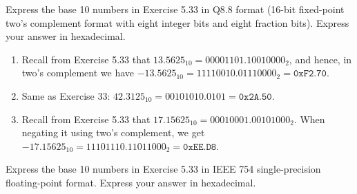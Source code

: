 \documentclass[12pt]{article}
\newenvironment{ex}[2][Exercise]{\begin{trivlist}
		\item[\hskip \labelsep {\bfseries #1}\hskip \labelsep {\bfseries #2.}]}{\end{trivlist}}
\newenvironment{sol}[1][Solution]{\begin{trivlist}
		\item[\hskip \labelsep {\bfseries #1:}]}{\end{trivlist}}
\begin{document}
\begin{ex}{5.35}
	Express the base 10 numbers in Exercise 5.33 in Q8.8 format (16-bit fixed-point
	two's complement format with eight integer bits and eight fraction bits).
	Express your answer in hexadecimal.
\end{ex}

\begin{sol}
	\begin{enumerate}[label=(\alph*)]
		\item Recall from Exercise 5.33 that $13.5625_{10}=0000 1101.1001 0000_2$, and hence,
		in two's complement we have $-13.5625_{10}= 1111 0010 . 0111 0000_2=\texttt{0xF2.70}$.
		\item Same as Exercise 33: $42.3125_{10}=0010 1010.0101=\texttt{0x2A.50}$.
		\item Recall from Exercise 5.33 that $17.15625_{10}=0001 0001.0010 1000_2$. When
		negating it using two's complement, we get
		$-17.15625_{10}=1110 1110.1101 1000_2=\texttt{0xEE.D8}$.
	\end{enumerate}
\end{sol}


\begin{ex}{5.37}
	Express the base 10 numbers in Exercise 5.33 in IEEE 754 single-precision
	floating-point format. Express your answer in hexadecimal.
\end{ex}
\end{document}
